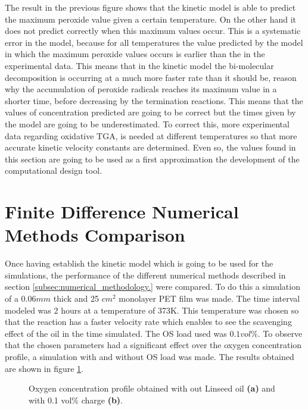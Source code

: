 The result in the previous figure shows that the kinetic model is able to predict the maximum peroxide value given a certain temperature. On the other hand it does not predict correctly when this maximum values occur. This is a systematic error in the model, because for all temperatures the value predicted by the model in which the maximum peroxide values occurs is earlier than the in the experimental data. This means that in the kinetic model the  bi-molecular decomposition is occurring at a much more faster rate than it should be, reason why the accumulation of peroxide radicals reaches its maximum value in a shorter time, before decreasing by the termination reactions. This means that the values of concentration  predicted are going to be correct but the times given by the model are going to be underestimated. To correct this, more experimental data regarding oxidative TGA, is needed at different temperatures so 
that more accurate kinetic velocity constants are determined. Even so, the values found in this section are going to be used as a first approximation the development of the computational design tool.  

\section{Finite Difference Numerical Methods Comparison}
Once having establish the kinetic model which is going to be used for the simulations, the performance of the different numerical methods described in section \ref{subsec:numerical_methodology.} were compared. To do this a simulation of a 0.06$mm$ thick and 25 $cm^2$ monolayer PET film was made. The time interval modeled was 2 hours at a temperature of 373K. This temperature was  chosen so that the reaction has a faster velocity rate which enables to see the scavenging effect of the oil in the time simulated. The OS load used was $0.1 vol\%$. To observe that the chosen parameters had a significant effect over the oxygen concentration profile, a simulation with and without OS load was made. The results obtained are shown in figure \ref{fig:oxygen_profile with and without OS}. 

\begin{figure}[ht]
    \centering
    \caption{Oxygen concentration profile obtained with out Linseed oil \textbf{(a)} and with 0.1 vol\% charge \textbf{(b)}.  }
    \label{fig:oxygen_profile with and without OS}
\end{figure}

